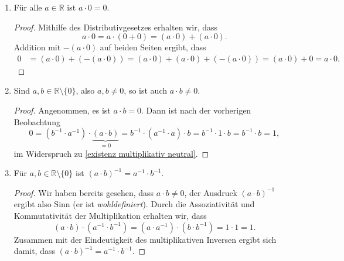\documentclass[a4paper,10pt]{article}
\newcommand{\R}{\mathbb{R}}
\begin{document}
 \begin{enumerate}[resume]
  \item
   Für alle $a \in \R$ ist $a \cdot 0 = 0$.
   \begin{proof}
    Mithilfe des Distributivgesetzes erhalten wir, dass
    \[
     a \cdot 0 = a \cdot (0 + 0) = (a \cdot 0) + (a \cdot 0).
    \]
    Addition mit $-(a \cdot 0)$ auf beiden Seiten ergibt, dass
    \begin{align*}
     0
     &= (a \cdot 0) + (-(a \cdot 0))
     = (a \cdot 0) + (a \cdot 0) + (-(a \cdot 0))
     = (a \cdot 0) + 0
     = a \cdot 0.
    \end{align*}
   \end{proof}
  \item
   Sind $a, b \in \R \setminus \{0\}$, also $a, b \neq 0$, so ist auch $a \cdot b \neq 0$.
   \begin{proof}
    Angenommen, es ist $a \cdot b = 0$. Dann ist nach der vorherigen Beobachtung
    \[
     0
     = \left(b^{-1} \cdot a^{-1}\right) \cdot \underbrace{(a \cdot b)}_{=0}
     = b^{-1} \cdot \left(a^{-1} \cdot a\right) \cdot b
     = b^{-1} \cdot 1 \cdot b
     = b^{-1} \cdot b
     = 1,
    \]
    im Widerspruch zu \ref{existenz multiplikativ neutral}.
   \end{proof}
  \item
   Für $a, b \in \R \setminus \{0\}$ ist $(a \cdot b)^{-1} = a^{-1} \cdot b^{-1}$.
   \begin{proof}
    Wir haben bereits gesehen, dass $a \cdot b \neq 0$, der Ausdruck $(a \cdot b)^{-1}$ ergibt also Sinn (er ist \emph{wohldefiniert}).
    Durch die Assoziativität und Kommutativität der Multiplikation erhalten wir, dass
    \[
     (a \cdot b) \cdot \left(a^{-1} \cdot b^{-1}\right)
     = \left(a \cdot a^{-1}\right) \cdot \left(b \cdot b^{-1}\right)
     = 1 \cdot 1
     = 1.
    \]
    Zusammen mit der Eindeutigkeit des multiplikativen Inversen ergibt sich damit, dass \mbox{$(a \cdot b)^{-1} = a^{-1} \cdot b^{-1}$}.
   \end{proof}
 \end{enumerate}
\end{document}
